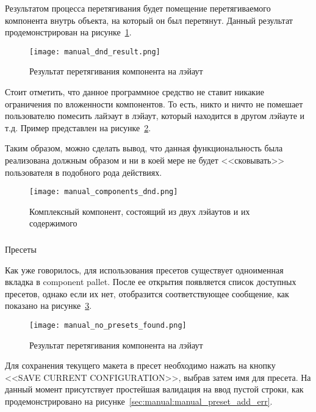 Результатом процесса перетягивания будет помещение перетягиваемого компонента внутрь объекта, на который он был перетянут. Данный результат продемонстрирован на рисунке~\ref{sec:manual:manual_dnd_result}.

\begin{figure}[ht]
  \centering
    \texttt{[image: manual\_dnd\_result.png]}
    \caption{Результат перетягивания компонента на лэйаут}
    \label{sec:manual:manual_dnd_result}
\end{figure}

Стоит отметить, что данное программное средство не ставит никакие ограничения по вложенности компонентов. То есть, никто и ничто не помешает пользователю помесить лайэаут в лэйаут, который находится в другом лэйауте и т.д. Пример представлен на рисунке~\ref{sec:manual:manual_components_dnd}.

Таким образом, можно сделать вывод, что данная функциональность была реализована должным образом и ни в коей мере не будет <<сковывать>> пользователя в подобного рода действиях.

\begin{figure}[ht]
  \centering
    \texttt{[image: manual\_components\_dnd.png]}
    \caption{Комплексный компонент, состоящий из двух лэйаутов и их содержимого}
    \label{sec:manual:manual_components_dnd}
\end{figure}

\subsubsection{}Пресеты
\

Как уже говорилось, для использования пресетов существует одноименная вкладка в component pallet. После ее открытия появляется список доступных пресетов, однако если их нет, отобразится соответствующее сообщение, как показано на рисунке~\ref{sec:manual:manual_no_presets_found}.

\begin{figure}[ht]
\centering
    \texttt{[image: manual\_no\_presets\_found.png]}
    \caption{Результат перетягивания компонента на лэйаут}
    \label{sec:manual:manual_no_presets_found}
\end{figure}

\pagebreak
Для сохранения текущего макета в пресет необходимо нажать на кнопку <<SAVE CURRENT CONFIGURATION>>, выбрав затем имя для пресета. На данный момент присутствует простейшая валидация на ввод пустой строки, как продемонстрировано на рисунке~\ref{sec:manual:manual_preset_add_err}.

